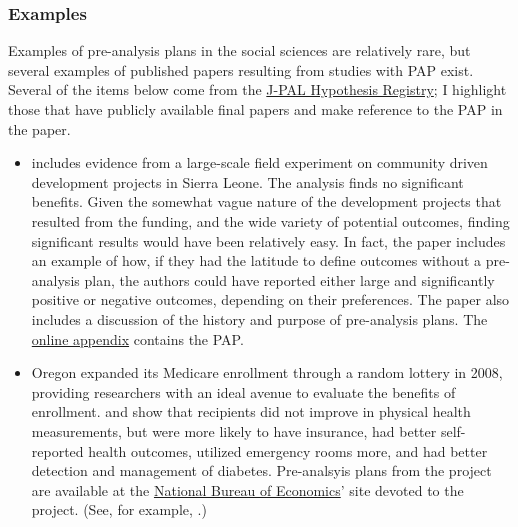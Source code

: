 \documentclass[12pt] {article}
\begin{document}
\subsubsection{Examples}\label{examples}
Examples of pre-analysis plans in the social sciences are relatively rare, but several examples of published papers resulting from studies with PAP exist. Several of the items below come from the \href{http://www.povertyactionlab.org/Hypothesis-Registry}{J-PAL Hypothesis Registry}; I highlight those that have publicly available final papers and make reference to the PAP in the paper. 


\begin{itemize}
\item 
 \cite{casey_reshaping_2012} includes evidence from a large-scale field experiment on community driven development projects in Sierra Leone. The analysis finds no significant benefits. Given the somewhat vague nature of the development projects that resulted from the funding, and the wide variety of potential outcomes, finding significant results would have been relatively easy. In fact, the paper includes an example of how, if they had the latitude to define outcomes without a pre-analysis plan, the authors could have reported either large and significantly positive or negative outcomes, depending on their preferences. The paper also includes a discussion of the history and purpose of pre-analysis plans. The \href{http://emiguel.econ.berkeley.edu/assets/miguel_research/8/_Appendix__Reshaping_Institutions_-_Evidence__on__Aid__Impacts__Using__a__Pre___Analysis__Plan.pdf}{online appendix}
contains the PAP.

\item 
Oregon expanded its Medicare enrollment through a random lottery in 2008, providing researchers with an ideal avenue to evaluate the benefits of enrollment. \cite{finkelstein_oregon_2012, doi:10.1056/NEJMsa1212321} and \cite{Taubman17012014} show that recipients did not improve in physical health measurements, but were more likely to have insurance, had better self-reported health outcomes, utilized emergency rooms more, and had better detection and management of diabetes. Pre-analsyis plans from the project are available at the \href{http://www.nber.org/oregon/documents.html}{National Bureau of Economics}' site devoted to the project. (See, for example, \cite{taubman_oregon_2013, baicker_katherine_oregon_2014}.)



\end{itemize}
\end{document}
